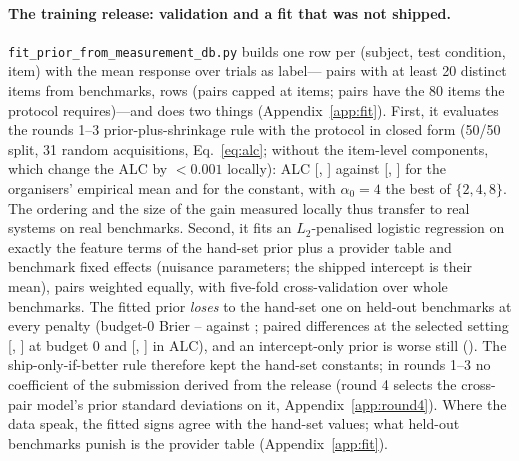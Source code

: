\documentclass{article}
\begin{document}
\paragraph{The training release: validation and a fit that was not shipped.} \texttt{fit\_prior\_from\_measurement\_db.py} builds one row per (subject, test condition, item) with the mean response over trials as label---\FitNPairs{} pairs with at least 20 distinct items from \FitNBench{} benchmarks, \FitNRows{} rows (pairs capped at \FitMaxItemsPerPair{} items; \FitRelNPairsAlc{} pairs have the 80 items the protocol requires)---and does two things (Appendix~\ref{app:fit}). First, it evaluates the rounds 1--3 prior-plus-shrinkage rule with the protocol in closed form (50/50 split, 31 random acquisitions, Eq.~\ref{eq:alc}; without the item-level components, which change the ALC by $<0.001$ locally): ALC \FitRelHandAlc{} [\FitRelHandAlcLo, \FitRelHandAlcHi] against \FitRelEmpAlc{} [\FitRelEmpAlcLo, \FitRelEmpAlcHi] for the organisers' empirical mean and \FitRelConstAlc{} for the constant, with $\alpha_0=4$ the best of $\{2,4,8\}$. The ordering and the size of the gain measured locally thus transfer to real systems on real benchmarks. Second, it fits an $L_2$-penalised logistic regression on exactly the feature terms of the hand-set prior plus a provider table and benchmark fixed effects (nuisance parameters; the shipped intercept is their mean), pairs weighted equally, with five-fold cross-validation over whole benchmarks. The fitted prior \emph{loses} to the hand-set one on held-out benchmarks at every penalty (budget-0 Brier \FitCMinBZero{}--\FitCMaxBZero{} against \FitRelHandBZero; paired differences at the selected setting \FitPairBZeroMean{} [\FitPairBZeroLo, \FitPairBZeroHi] at budget 0 and \FitPairAlcMean{} [\FitPairAlcLo, \FitPairAlcHi] in ALC), and an intercept-only prior is worse still (\FitRelIntOnlyBZero). The ship-only-if-better rule therefore kept the hand-set constants; in rounds 1--3 no coefficient of the submission derived from the release (round 4 selects the cross-pair model's prior standard deviations on it, Appendix~\ref{app:round4}). Where the data speak, the fitted signs agree with the hand-set values; what held-out benchmarks punish is the provider table (Appendix~\ref{app:fit}).
\end{document}
